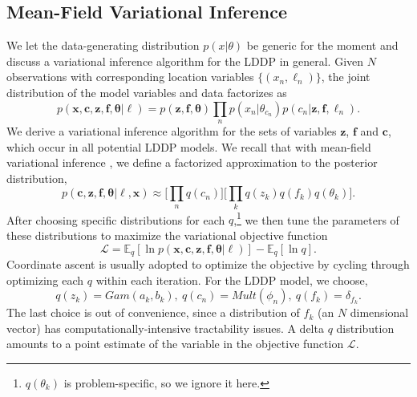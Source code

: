 \documentclass[runningheads,a4paper]{iscide}
\newcommand{\bs}[1]{\boldsymbol{#1}}
\begin{document}
\subsection{Mean-Field Variational Inference}
We let the data-generating distribution $p(x|\theta)$ be generic for the moment and discuss a variational inference algorithm for the LDDP in general.
Given $N$ observations with corresponding location variables $\{(x_n,\ell_n)\}$, the joint distribution of
the model variables and data factorizes as
\begin{equation}
\textstyle p(\bs{x},\bs{c},\bs{z},\bs{f},\bs{\theta}|\bs{\ell}) = p(\bs{z},\bs{f},\bs{\theta})\prod_n p(x_n|\theta_{c_n})p(c_n|\bs{z},\bs{f},\ell_n).
\end{equation}
We derive a variational inference algorithm for the sets of variables $\bs{z}$, $\bs{f}$ and $\bs{c}$, which occur in all potential LDDP models. We recall that with mean-field variational inference \cite{Bishop06prml,Blei14BCCR}, we define a factorized approximation to the posterior distribution, $$\textstyle p(\bs{c},\bs{z},\bs{f},\bs{\theta}|\bs{\ell},\bs{x}) \approx \big[\prod_n q(c_n)\big]\big[\prod_k q(z_k)q(f_k)q(\theta_k)\big].$$ After choosing specific distributions for each $q$,\footnote{$q(\theta_k)$ is problem-specific, so we ignore it here.} we then tune the parameters of these distributions to maximize the variational objective function
$$\mathcal{L} = \mathbb{E}_q[\ln p(\bs{x},\bs{c},\bs{z},\bs{f},\bs{\theta}|\bs{\ell})] - \mathbb{E}_q[\ln q].$$
Coordinate ascent is usually adopted to optimize the objective by cycling through optimizing each $q$ within each iteration. For the LDDP model, we choose,
$$q(z_k) = Gam(a_k,b_k),~ q(c_n) = Mult(\phi_n),~ q(f_k) = \delta_{f_k}.$$
The last choice is out of convenience, since a distribution of $f_k$ (an $N$ dimensional vector) has computationally-intensive tractability issues. A delta $q$ distribution amounts to a point estimate of the variable in the objective function $\mathcal{L}$.
\end{document}
